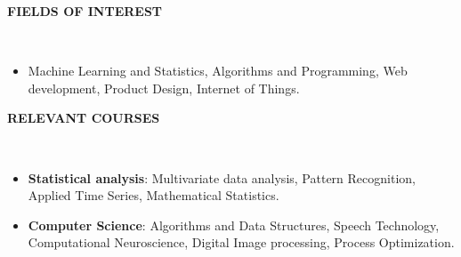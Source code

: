 \documentclass[a4paper,10pt]{article}
\newcommand{\lsep}{-0.5cm}
\newcommand{\resheading}[1]{{\small \colorbox{mygrey}{\begin{minipage}{0.975\textwidth}{\textbf{#1 \vphantom{p\^{E}}}}\end{minipage}}}}
\begin{document}
\resheading{\textbf{FIELDS OF INTEREST} }\\[\lsep]
    \begin{itemize}
        \vspace{3pt}
        \item \noindent Machine Learning and Statistics, Algorithms and Programming, Web development, Product Design, Internet of Things.
    \end{itemize}

\resheading{\textbf{RELEVANT COURSES} }\\[\lsep]
\begin{itemize}
    \vspace{3pt}
    \item \textbf{Statistical analysis}: Multivariate data analysis, Pattern Recognition, Applied Time Series, Mathematical Statistics.\vspace{-5pt}    
    \item \textbf{Computer Science}: Algorithms and Data Structures, Speech Technology,  Computational Neuroscience, Digital Image processing, Process Optimization.
\end{itemize}
\end{document}
